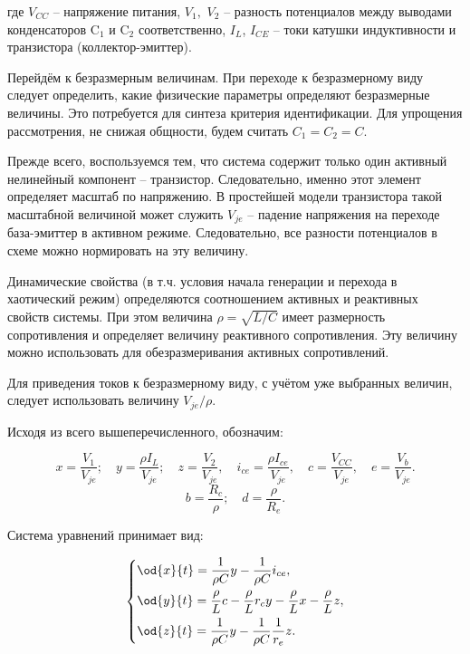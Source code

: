 \noindent
где
$V_{CC} $ -- напряжение питания,
$V_1,$ $V_2$ -- разность потенциалов между выводами конденсаторов
$\mathrm{C}_1$ и $\mathrm{C}_2$ соответственно,
$I_L$, $I_{CE}$ -- токи катушки индуктивности и транзистора (коллектор-эмиттер).

Перейдём к безразмерным величинам.
При переходе к безразмерному виду следует определить,
какие физические параметры определяют безразмерные величины.
Это потребуется для синтеза критерия идентификации.
Для упрощения рассмотрения, не снижая общности,
будем считать $C_1 = C_2 = C$.

Прежде всего, воспользуемся тем, что система содержит только один
активный нелинейный компонент -- транзистор.
Следовательно, именно этот элемент определяет
масштаб по напряжению. В простейшей модели транзистора
такой масштабной величиной может служить
$V_{je}$ -- падение напряжения на переходе база-эмиттер
в активном режиме. Следовательно, все разности потенциалов в схеме можно нормировать
на эту величину.

Динамические свойства (в т.ч. условия начала генерации и перехода в хаотический режим) определяются
соотношением активных и реактивных свойств системы. При этом величина
$ \rho = \sqrt{L/C} $ имеет размерность сопротивления
и определяет величину реактивного сопротивления. Эту величину можно использовать
для обезразмеривания активных сопротивлений.

Для приведения токов к безразмерному виду, с учётом уже выбранных величин,
следует использовать величину $ V_{je} / \rho$.


Исходя из всего вышеперечисленного, обозначим:

\[
  x = \frac{V_{1}}{V_{je}} ; \quad
  y = \frac{\rho I_L}{V_{je}} ; \quad
  z = \frac{V_{2}}{V_{je}}, \quad
  i_{ce} = \frac{\rho I_{ce}}{V_{je}}, \quad
  c = \frac{V_{CC}}{V_{je}}, \quad
  e = \frac{V_{b}}{V_{je}}.
\]
\[
  b = \frac{R_c}{\rho}; \quad
  d = \frac{\rho}{R_e}. %
\]

Система уравнений принимает вид:


\begin{equation}
\label{atu:eq:colp_phys2}
\begin{dcases}
  \od{x}{t}  = \dfrac{1}{\rho C}  y - \dfrac{1}{\rho C} i_{ce} , \\
  \od{y}{t}  = \dfrac{\rho}{L} c    - \dfrac{\rho}{L} r_c y - \dfrac{\rho}{L} x- \dfrac{\rho}{L} z, \\
  \od{z}{t}  = \dfrac{1}{\rho C}  y - \dfrac{1}{\rho C} \dfrac{1}{r_e} z.
\end{dcases}
\end{equation}

